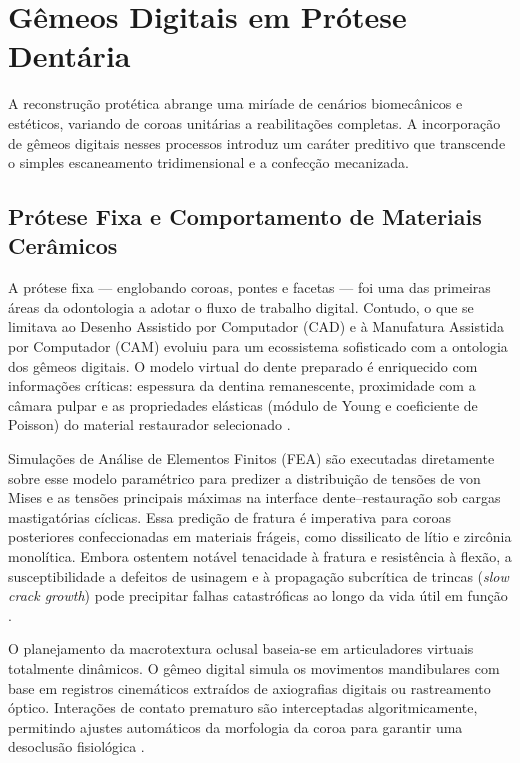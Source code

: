 \section{Gêmeos Digitais em Prótese Dentária}

A reconstrução protética abrange uma miríade de cenários biomecânicos e estéticos, variando de coroas unitárias a reabilitações completas. A incorporação de gêmeos digitais nesses processos introduz um caráter preditivo que transcende o simples escaneamento tridimensional e a confecção mecanizada.

\subsection{Prótese Fixa e Comportamento de Materiais Cerâmicos}

A prótese fixa --- englobando coroas, pontes e facetas --- foi uma das primeiras áreas da odontologia a adotar o fluxo de trabalho digital. Contudo, o que se limitava ao Desenho Assistido por Computador (CAD) e à Manufatura Assistida por Computador (CAM) evoluiu para um ecossistema sofisticado com a ontologia dos gêmeos digitais. O modelo virtual do dente preparado é enriquecido com informações críticas: espessura da dentina remanescente, proximidade com a câmara pulpar e as propriedades elásticas (módulo de Young e coeficiente de Poisson) do material restaurador selecionado \cite{li2025impacts}.

Simulações de Análise de Elementos Finitos (FEA) são executadas diretamente sobre esse modelo paramétrico para predizer a distribuição de tensões de von Mises e as tensões principais máximas na interface dente--restauração sob cargas mastigatórias cíclicas. Essa predição de fratura é imperativa para coroas posteriores confeccionadas em materiais frágeis, como dissilicato de lítio e zircônia monolítica. Embora ostentem notável tenacidade à fratura e resistência à flexão, a susceptibilidade a defeitos de usinagem e à propagação subcrítica de trincas (\textit{slow crack growth}) pode precipitar falhas catastróficas ao longo da vida útil em função \cite{zhang2024recursive}.


O planejamento da macrotextura oclusal baseia-se em articuladores virtuais totalmente dinâmicos. O gêmeo digital simula os movimentos mandibulares com base em registros cinemáticos extraídos de axiografias digitais ou rastreamento óptico. Interações de contato prematuro são interceptadas algoritmicamente, permitindo ajustes automáticos da morfologia da coroa para garantir uma desoclusão fisiológica \cite{roy2025applications}.

